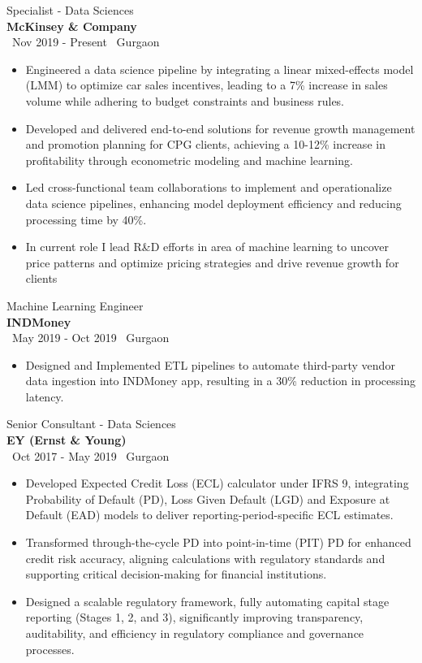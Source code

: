 \documentclass[a4paper,10pt]{article}
\begin{document}
{\large Specialist - Data Sciences} \\
\textbf{McKinsey \& Company} \\
\faCalendar \, Nov 2019 - Present \hfill \faMapMarker \, Gurgaon
\begin{itemize}[itemsep=1pt, topsep=0pt] %
    \item Engineered a data science pipeline by integrating a linear mixed-effects model (LMM) to optimize car sales incentives, leading to a 7\% increase in sales volume while adhering to budget constraints and business rules.
    \item Developed and delivered end-to-end solutions for revenue growth management and promotion planning for CPG clients, achieving a 10-12\% increase in profitability through econometric modeling and machine learning.
    \item Led cross-functional team collaborations to implement and operationalize data science pipelines, enhancing model deployment efficiency and reducing processing time by 40\%.
    \item In current role I lead R&D efforts in area of machine learning to uncover price patterns and optimize pricing strategies and drive revenue growth for clients

\end{itemize}

{\large Machine Learning Engineer} \\
\textbf{INDMoney} \\
\faCalendar \, May 2019 - Oct 2019 \hfill \faMapMarker \, Gurgaon
\begin{itemize}[itemsep=1pt, topsep=0pt]
    \item Designed and Implemented ETL pipelines to automate third-party vendor data ingestion into INDMoney app, resulting in a 30\% reduction in processing latency.
\end{itemize}

{\large Senior Consultant - Data Sciences} \\
\textbf{EY (Ernst \& Young)} \\
\faCalendar \, Oct 2017 - May 2019 \hfill \faMapMarker \, Gurgaon
\begin{itemize}[itemsep=1pt, topsep=0pt]
    \item Developed Expected Credit Loss (ECL) calculator under IFRS 9, integrating Probability of Default (PD), Loss Given Default (LGD) and Exposure at Default (EAD) models to deliver reporting-period-specific ECL estimates.
    \item Transformed through-the-cycle PD into point-in-time (PIT) PD for enhanced credit risk accuracy, aligning calculations with regulatory standards and supporting critical decision-making for financial institutions.
    \item Designed a scalable regulatory framework, fully automating capital stage reporting (Stages 1, 2, and 3), significantly improving transparency, auditability, and efficiency in regulatory compliance and governance processes.
\end{itemize}
\end{document}
